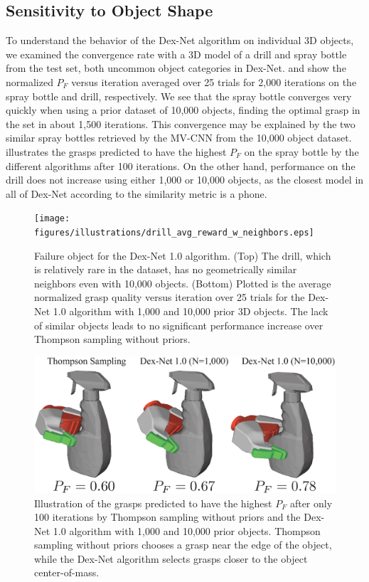 \subsection{Sensitivity to Object Shape}
To understand the behavior of the Dex-Net algorithm on individual 3D objects, we examined the convergence rate with a 3D model of a drill and spray bottle from the test set, both uncommon object categories in Dex-Net.
 and   show the normalized $P_F$ versus iteration averaged over 25 trials for 2,000 iterations on the spray bottle and drill, respectively.
We see that the spray bottle converges very quickly when using a prior dataset of 10,000 objects, finding the optimal grasp in the set in about 1,500 iterations.
This convergence may be explained by the two similar spray bottles retrieved by the MV-CNN from the 10,000 object dataset.
 illustrates the grasps predicted to have the highest $P_F$ on the spray bottle by the different algorithms after 100 iterations.
On the other hand, performance on the drill does not increase using either 1,000 or 10,000 objects, as the closest model in all of Dex-Net according to the similarity metric is a phone.

\begin{figure}[t!]
\centering
\texttt{[image: figures/illustrations/drill\_avg\_reward\_w\_neighbors.eps]}
\caption{Failure object for the Dex-Net 1.0 algorithm. (Top) The drill, which is relatively rare in the dataset, has no geometrically similar neighbors even with 10,000 objects. (Bottom) Plotted is the average normalized grasp quality versus iteration over 25 trials for the Dex-Net 1.0 algorithm with 1,000 and 10,000 prior 3D objects. The lack of similar objects leads to no significant performance increase over Thompson sampling without priors. }
\vspace*{-10pt}
\end{figure}

\begin{figure}[t!]
\centering
\includegraphics[scale=0.29]{figures/illustrations/spray_grasps.eps}
\caption{Illustration of the grasps predicted to have the highest $P_F$ after only 100 iterations by Thompson sampling without priors and the Dex-Net 1.0 algorithm with 1,000 and 10,000 prior objects. Thompson sampling without priors chooses a grasp near the edge of the object, while the Dex-Net algorithm selects grasps closer to the object center-of-mass.}
\vspace*{-5pt}
\end{figure}


